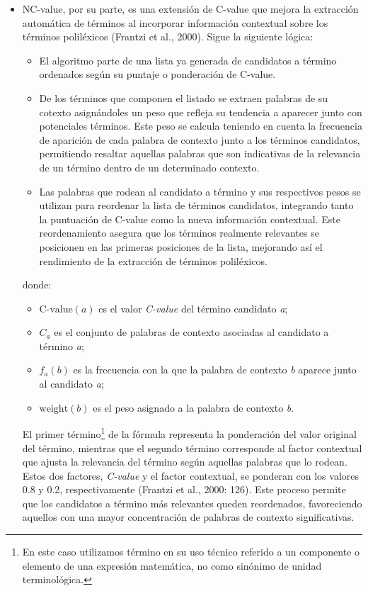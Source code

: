 \begin{itemize}
\item NC-value, por su parte, es una extensión de C-value que mejora la extracción automática de términos al incorporar información contextual sobre los términos poliléxicos (Frantzi et al., 2000). Sigue la siguiente lógica:
\begin{itemize}
    \item El algoritmo parte de una lista ya generada de candidatos a término ordenados según su puntaje o ponderación de C-value. 
    \item De los términos que componen el listado se extraen palabras de su cotexto asignándoles un peso que refleja su tendencia a aparecer junto con potenciales términos. Este peso se calcula teniendo en cuenta la frecuencia de aparición de cada palabra de contexto junto a los términos candidatos, permitiendo resaltar aquellas palabras que son indicativas de la relevancia de un término dentro de un determinado contexto.
    \item Las palabras que rodean al candidato a término y sus respectivos pesos se utilizan para reordenar la lista de términos candidatos, integrando tanto la puntuación de C-value como la nueva información contextual. Este reordenamiento asegura que los términos realmente relevantes se posicionen en las primeras posiciones de la lista, mejorando así el rendimiento de la extracción de términos poliléxicos.
\end{itemize}

\label{eq:ncvalue}


donde:

\begin{itemize}
    \item $\mathrm{C\text{-}value}(a)$ es el valor \emph{C-value} del término candidato \emph{a};
    \item $C_a$ es el conjunto de palabras de contexto asociadas al candidato a término \emph{a};
    \item $f_a(b)$ es la frecuencia con la que la palabra de contexto \emph{b} aparece junto al candidato \emph{a};
    \item $\mathrm{weight}(b)$ es el peso asignado a la palabra de contexto \emph{b}.
\end{itemize}

El primer término\footnote{En este caso utilizamos término en su uso técnico referido a un componente o elemento de una expresión matemática, no como sinónimo de unidad terminológica.
} de la fórmula representa la ponderación del valor original del término, mientras que el segundo término corresponde al factor contextual que ajusta la relevancia del término según aquellas palabras que lo rodean. Estos dos factores, \textit{C-value} y el factor contextual, se ponderan con los valores 0.8 y 0.2, respectivamente (Frantzi et al., 2000: 126). Este proceso permite que los candidatos a término más relevantes queden reordenados, favoreciendo aquellos con una mayor concentración de palabras de contexto significativas.


\end{itemize}

